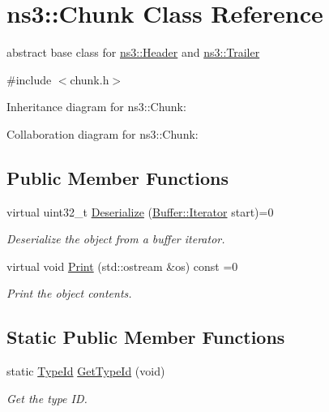 \hypertarget{classns3_1_1Chunk}{}\section{ns3\+:\+:Chunk Class Reference}
\label{classns3_1_1Chunk}


abstract base class for \hyperlink{classns3_1_1Header}{ns3\+::\+Header} and \hyperlink{classns3_1_1Trailer}{ns3\+::\+Trailer}  




{\ttfamily \#include $<$chunk.\+h$>$}



Inheritance diagram for ns3\+:\+:Chunk\+:


Collaboration diagram for ns3\+:\+:Chunk\+:
\subsection*{Public Member Functions}
\begin{DoxyCompactItemize}
\item 
virtual uint32\+\_\+t \hyperlink{classns3_1_1Chunk_a49f60e6cd0b85f977a31a384b4bd6c1e}{Deserialize} (\hyperlink{classns3_1_1Buffer_1_1Iterator}{Buffer\+::\+Iterator} start)=0
\begin{DoxyCompactList}\small\item\em Deserialize the object from a buffer iterator. \end{DoxyCompactList}\item 
virtual void \hyperlink{classns3_1_1Chunk_ac01218376fb52ccdec96c3dc0f8cf759}{Print} (std\+::ostream \&os) const =0
\begin{DoxyCompactList}\small\item\em Print the object contents. \end{DoxyCompactList}\end{DoxyCompactItemize}
\subsection*{Static Public Member Functions}
\begin{DoxyCompactItemize}
\item 
static \hyperlink{classns3_1_1TypeId}{Type\+Id} \hyperlink{classns3_1_1Chunk_a3b52b68db9cbec4e5aab830f80c1721c}{Get\+Type\+Id} (void)
\begin{DoxyCompactList}\small\item\em Get the type ID. \end{DoxyCompactList}\end{DoxyCompactItemize}
